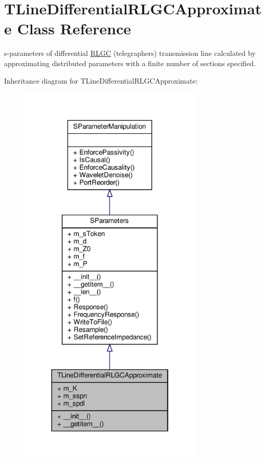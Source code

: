 \hypertarget{classSignalIntegrity_1_1SParameters_1_1Devices_1_1TLineDifferentialRLGCApproximate_1_1TLineDifferentialRLGCApproximate}{}\section{T\+Line\+Differential\+R\+L\+G\+C\+Approximate Class Reference}
\label{classSignalIntegrity_1_1SParameters_1_1Devices_1_1TLineDifferentialRLGCApproximate_1_1TLineDifferentialRLGCApproximate}


s-\/parameters of differential \hyperlink{namespaceSignalIntegrity_1_1SParameters_1_1RLGC}{R\+L\+GC} (telegrapher\textquotesingle{}s) transmission line calculated by approximating distributed parameters with a finite number of sections specified.  




Inheritance diagram for T\+Line\+Differential\+R\+L\+G\+C\+Approximate\+:
\nopagebreak
\begin{figure}[H]
\begin{center}
\leavevmode
\includegraphics[width=250pt]{classSignalIntegrity_1_1SParameters_1_1Devices_1_1TLineDifferentialRLGCApproximate_1_1TLineDiffebb8034df57e391d821dbb5c30e6ad43d}
\end{center}
\end{figure}


